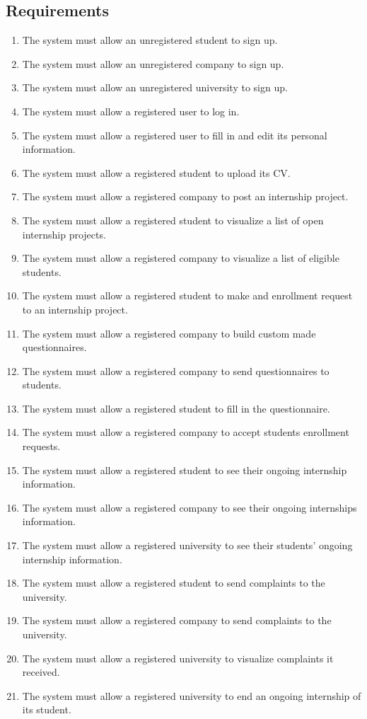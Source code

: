 \subsection{Requirements}

\begin{enumerate}[label=\textbf{R\arabic* -}]
    \item The system must allow an unregistered student to sign up.
    \item The system must allow an unregistered company to sign up.
    \item The system must allow an unregistered university to sign up.
    \item The system must allow a registered user to log in.
    \item The system must allow a registered user to fill in and edit its personal information.
    \item The system must allow a registered student to upload its CV.
    \item The system must allow a registered company to post an internship project.
    \item The system must allow a registered student to visualize a list of open internship projects.
    \item The system must allow a registered company to visualize a list of eligible students.
    \item The system must allow a registered student to make and enrollment request to an internship project.
    \item The system must allow a registered company to build custom made questionnaires.
    \item The system must allow a registered company to send questionnaires to students.
    \item The system must allow a registered student to fill in the questionnaire.
    \item The system must allow a registered company to accept students enrollment requests.
    \item The system must allow a registered student to see their ongoing internship information.
    \item The system must allow a registered company to see their ongoing internships information.
    \item The system must allow a registered university to see their students' ongoing internship information.
    \item The system must allow a registered student to send complaints to the university.
    \item The system must allow a registered company to send complaints to the university.
    \item The system must allow a registered university to visualize complaints it received.
    \item The system must allow a registered university to end an ongoing internship of its student.
\end{enumerate}

